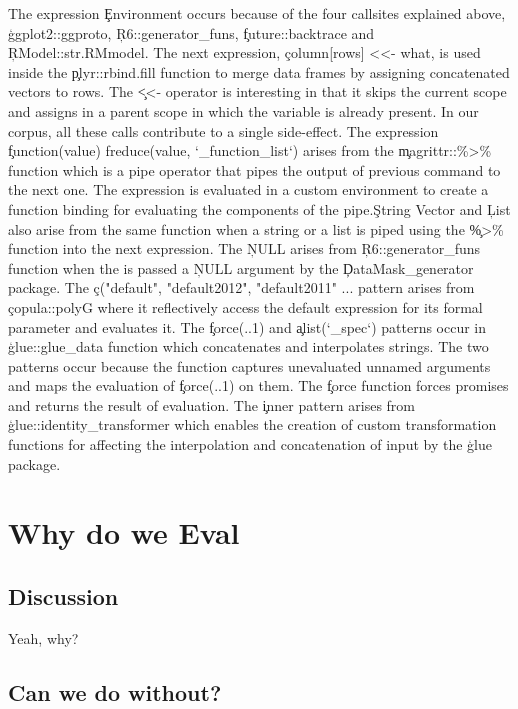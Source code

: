 \documentclass[USenglish,cleveref, autoref, thm-restate]{lipics-v2019}
\begin{document}
The expression \c{Environment} occurs because of the four callsites
explained above, \c{ggplot2::ggproto}, \c{R6::generator_funs},
\c{future::backtrace} and \c{RModel::str.RMmodel}. The next
expression, \c{column[rows] <<- what}, is used inside the
\c{plyr::rbind.fill} function to merge data frames by assigning
concatenated vectors to rows. The \c{<<-} operator is interesting in
that it skips the current scope and assigns in a parent scope in which
the variable is already present. In our corpus, all these \eval calls
contribute to a single side-effect. The expression \c{function(value)
  freduce(value, `_function_list`)} arises from the
\c{magrittr::\%>\%} function which is a pipe operator that pipes the
output of previous command to the next one. The expression is
evaluated in a custom environment to create a function binding for
evaluating the components of the pipe.\c{String Vector} and \c{List}
also arise from the same function when a string or a list is piped
using the \c{\%>\%} function into the next expression. The \c{NULL}
arises from \c{R6::generator_funs} function when the \eval is passed a
\c{NULL} argument by the \c{DataMask_generator} package. The
\c{c("default", "default2012", "default2011" ...} pattern arises from
\c{copula::polyG} where it reflectively access the default expression
for its formal parameter and evaluates it. The \c{force(..1)} and
\c{alist(`_spec`)} patterns occur in \c{glue::glue_data} function
which concatenates and interpolates strings. The two patterns occur
because the function captures unevaluated unnamed arguments and maps
the evaluation of \c{force(..1)} on them. The \c{force} function
forces promises and returns the result of evaluation. The \c{inner}
pattern arises from \c{glue::identity_transformer} which enables the
creation of custom transformation functions for affecting the
interpolation and concatenation of input by the \c{glue} package.


\section{Why do we Eval}

\subsection{Discussion}

Yeah, why?

\subsection{Can we do without?}
\end{document}
